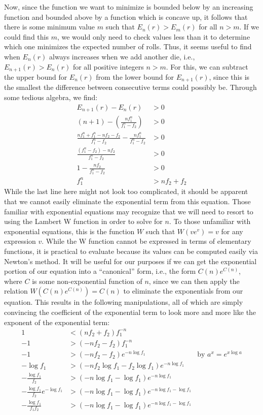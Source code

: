\documentclass{article}
\begin{document}
Now, since the function we want to minimize is bounded below by an increasing function and bounded above by a function which is concave up, it follows that there is some minimum value $m$ such that $E_n(r) > E_m(r)$ for all $n > m$.
If we could find  this $m$, we would only need to check values less than it to determine which one minimizes the expected number of rolls.
Thus, it seems useful to find when $E_n(r)$ always increases when we add another die, i.e., $E_{n+1}(r) > E_n(r)$ for all positive integers $n > m$.
For this, we can subtract the upper bound for $E_n(r)$ from the lower bound for $E_{n+1}(r)$, since this is the smallest the difference between consecutive terms could possibly be.
Through some tedious algebra, we find:
\begin{align}
    E_{n+1}(r) - E_n(r) &> 0 \\
    (n + 1) - \left( \frac{nf_1^n}{f_1^n - f_2} \right) &> 0 \\
    \frac{nf_1^n + f_1^n-nf_2-f_2}{f_1^n-f_2} - \frac{nf_1^n}{f_1^n - f_2} &> 0 \\
    \frac{(f_1^n-f_2) - nf_2}{f_1^n-f_2} &> 0 \\
    1 - \frac{nf_2}{f_1^n-f_2} &> 0 \\
    f_1^n &>nf_2 + f_2
\end{align}
While the last line here might not look too complicated, it should be apparent that we cannot easily eliminate the exponential term from this equation.
Those familiar with exponential equations may recognize that we will need to resort to using the Lambert W function in order to solve for $n$.
To those unfamiliar with exponential equations, this is the function $W$ such that $W(ve^v)=v$ for any expression $v$. 
While the W function cannot be expressed in terms of elementary functions, it is practical to evaluate because its values can be computed easily via Newton's method.
It will be useful for our purposes if we can get the exponential portion of our equation into a ``canonical'' form, i.e., the form $C(n)e^{C(n)}$, where $C$ is some non-exponential function of $n$, since we can then apply the relation $W(C(n)e^{C(n)})=C(n)$ to eliminate the exponentials from our equation.
This results in the following manipulations, all of which are simply convincing the coefficient of the exponential term to look more and more like the exponent of the exponential term:
\begin{align}
    1 &< (nf_2+f_2)f_1^{-n} \\
    -1 &> (-nf_2-f_2)f_1^{-n} \\
    -1 &> (-nf_2-f_2)e^{-n\log{f_1}} & \text{by } a^x=e^{x\log{a}}\\
    -\log{f_1} &> (-nf_2\log{f_1}-f_2\log{f_1})e^{-n\log{f_1}}\\
    -\frac{\log{f_1}}{f_2} &> (-n\log{f_1}-\log{f_1})e^{-n\log{f_1}}\\
    -\frac{\log{f_1}}{f_2}e^{-\log{f_1}} &> (-n\log{f_1}-\log{f_1})e^{-n\log{f_1}-\log{f_1}}\\
    -\frac{\log{f_1}}{f_1f_2} &> (-n\log{f_1}-\log{f_1})e^{-n\log{f_1}-\log{f_1}}
\end{align}
\end{document}
